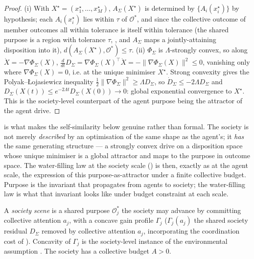 \documentclass[11pt,twocolumn,a4paper]{article}
\newcommand{\drive}{\Phi}            %
\newcommand{\Purp}{x^{\star}}        %
\newcommand{\Soc}{\Sigma}            %
\newcommand{\Out}{\mathcal{O}}       %
\newcommand{\tol}{\tau}
\newcommand{\norm}[1]{\lVert#1\rVert}
\newcommand{\dist}{d}
\begin{document}
\begin{proof}
(i) With $X^\star=(\Purp_1,\dots,\Purp_M)$, $A_\Soc(X^\star)$ is determined
by $\{A_i(\Purp_i)\}$ by hypothesis; each $A_i(\Purp_i)$ lies within $\tol$
of $\Out^\ast$, and since the collective outcome of member outcomes all
within tolerance is itself within tolerance (the shared purpose is a region
with tolerance $\tol$, , and $A_\Soc$ maps a
jointly-attaining disposition into it), $\dist(A_\Soc(X^\star),\Out^\ast)\le
\tol$. (ii) $\drive_\Soc$ is $\Lambda$-strongly convex, so along
$\dot X=-\nabla\drive_\Soc(X)$,
$\frac{d}{dt}D_\Soc=\nabla\drive_\Soc(X)^\top\dot X=
-\norm{\nabla\drive_\Soc(X)}^2\le0$, vanishing only where
$\nabla\drive_\Soc(X)=0$, i.e. at the unique minimiser $X^\star$. Strong
convexity gives the Polyak--\L{}ojasiewicz inequality
$\tfrac12\norm{\nabla\drive_\Soc}^2\ge\Lambda D_\Soc$, so
$\dot D_\Soc\le-2\Lambda D_\Soc$ and $D_\Soc(X(t))\le e^{-2\Lambda
t}D_\Soc(X(0))\to0$: global exponential convergence to $X^\star$. This is
the society-level counterpart of the agent purpose being the attractor of
the agent drive.
\end{proof}

\begin{remark}
\label{rem:purpose-propagates}
 is what makes the self-similarity below genuine
rather than formal. The society is not merely \emph{described} by an
optimisation of the same shape as the agent's; it \emph{has} the same
generating structure --- a strongly convex drive on a disposition space
whose unique minimiser is a global attractor and maps to the purpose in
outcome space. The water-filling law at the society scale ()
is then, exactly as at the agent scale, the expression of this
purpose-as-attractor under a finite collective budget. Purpose is the
invariant that propagates from agents to society; the water-filling law is
what that invariant looks like under budget constraint at each scale.
\end{remark}

\begin{definition}
\label{def:socscene}
A \emph{society scene} is a shared purpose $\Out^\ast_j$ the society may
advance by committing collective attention $a_j$, with a concave gain
profile $\Gamma_j$ ($\Gamma_j(a_j)$ the shared society residual $D_\Soc$
removed by collective attention $a_j$, incorporating the coordination cost
of ). Concavity of $\Gamma_j$ is the society-level
instance of the environmental assumption . The society has
a collective budget $A>0$.
\end{definition}
\end{document}
